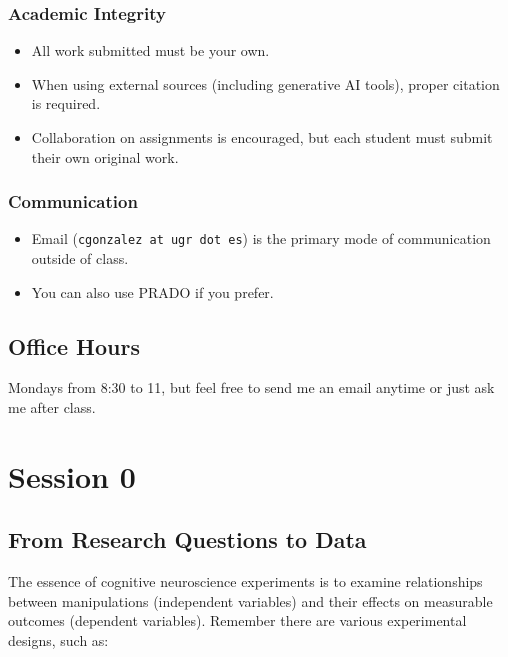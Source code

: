 \documentclass[
  letterpaper,
  DIV=11,
  numbers=noendperiod]{scrreprt}
\providecommand{\tightlist}{%
  \setlength{\itemsep}{0pt}\setlength{\parskip}{0pt}}\usepackage{longtable,booktabs,array}
\begin{document}
\hypertarget{academic-integrity}{%
\subsection{Academic Integrity}\label{academic-integrity}}

\begin{itemize}
\tightlist
\item
  All work submitted must be your own.
\item
  When using external sources (including generative AI tools), proper
  citation is required.
\item
  Collaboration on assignments is encouraged, but each student must
  submit their own original work.
\end{itemize}

\hypertarget{communication}{%
\subsection{Communication}\label{communication}}

\begin{itemize}
\tightlist
\item
  Email (\texttt{cgonzalez\ at\ ugr\ dot\ es}) is the primary mode of
  communication outside of class.
\item
  You can also use PRADO if you prefer.
\end{itemize}

\hypertarget{office-hours}{%
\section{Office Hours}\label{office-hours}}

Mondays from 8:30 to 11, but feel free to send me an email anytime or
just ask me after class.


\hypertarget{session-0}{%
\chapter{Session 0}\label{session-0}}

\hypertarget{from-research-questions-to-data}{%
\section{From Research Questions to
Data}\label{from-research-questions-to-data}}

The essence of cognitive neuroscience experiments is to examine
relationships between manipulations (independent variables) and their
effects on measurable outcomes (dependent variables). Remember there are
various experimental designs, such as:
\end{document}
